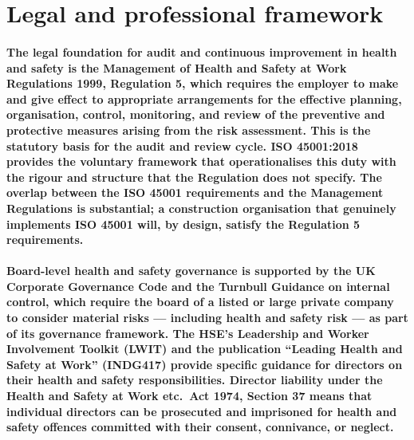 
\section{Legal and professional framework}

\paragraph{The legal foundation for audit and continuous improvement in health and safety is the Management of Health and Safety at Work Regulations 1999, Regulation 5, which requires the employer to make and give effect to appropriate arrangements for the effective planning, organisation, control, monitoring, and review of the preventive and protective measures arising from the risk assessment. This is the statutory basis for the audit and review cycle. ISO 45001:2018 provides the voluntary framework that operationalises this duty with the rigour and structure that the Regulation does not specify. The overlap between the ISO 45001 requirements and the Management Regulations is substantial; a construction organisation that genuinely implements ISO 45001 will, by design, satisfy the Regulation 5 requirements.}

\paragraph{Board-level health and safety governance is supported by the UK Corporate Governance Code and the Turnbull Guidance on internal control, which require the board of a listed or large private company to consider material risks --- including health and safety risk --- as part of its governance framework. The HSE's Leadership and Worker Involvement Toolkit (LWIT) and the publication ``Leading Health and Safety at Work'' (INDG417) provide specific guidance for directors on their health and safety responsibilities. Director liability under the Health and Safety at Work etc.\ Act 1974, Section 37 means that individual directors can be prosecuted and imprisoned for health and safety offences committed with their consent, connivance, or neglect.}


